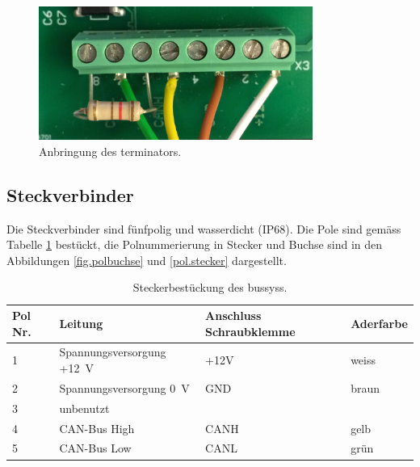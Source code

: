 \begin{figure}
	\centering
		\includegraphics[width=0.8\textwidth]{images/fotos/terminator.png}
	\caption{Anbringung des \gls{terminator}s.}
	\label{fig.terminator}
\end{figure}

\subsection{Steckverbinder}
Die Steckverbinder sind fünfpolig und wasserdicht (IP68). Die Pole sind gemäss Tabelle \ref{table.stecker} bestückt, die Polnummerierung in Stecker und Buchse sind in den Abbildungen \ref{fig.polbuchse} und \ref{pol.stecker} dargestellt.

\begin{table}
\begin{tabular}{|l|l|l|l|}
\hline \textbf{Pol Nr.}      & \textbf{Leitung} & Anschluss Schraubklemme & Aderfarbe\\ 
\hline 1 & Spannungsversorgung +12~V & +12V & weiss \\
\hline 2 & Spannungsversorgung 0~V & GND & braun \\
\hline 3 & unbenutzt &  &  \\
\hline 4 & CAN-Bus High & CANH & gelb \\
\hline 5 & CAN-Bus Low & CANL & grün \\
\hline 
\end{tabular}
\caption{Steckerbestückung des \gls{bussys}s.}
\label{table.stecker}
\end{table}  

